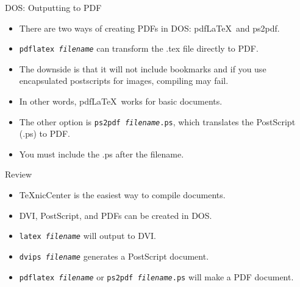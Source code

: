 \documentclass[pdf]{prosper}
\begin{document}
\begin{slide}{DOS: Outputting to PDF}
	\begin{itemize}
		\item There are two ways of creating PDFs in DOS: pdf\LaTeX\ and ps2pdf.
		\item \texttt{pdflatex \textit{filename}} can transform the .tex file directly to PDF.
		\item The downside is that it will not include bookmarks and if you use encapsulated postscripts for images, compiling may fail.
		\item In other words, pdf\LaTeX\ works for basic documents.
		\item The other option is \texttt{ps2pdf \textit{filename}.ps}, which translates the PostScript (.ps) to PDF.
		\item You must include the .ps after the filename.
	\end{itemize}
\end{slide}
\begin{slide}{Review}
	\begin{itemize}
		\item \TeX nicCenter is the easiest way to compile documents.
		\item DVI, PostScript, and PDFs can be created in DOS.
		\item \texttt{latex \textit{filename}} will output to DVI.
		\item \texttt{dvips \textit{filename}} generates a PostScript document.
		\item \texttt{pdflatex \textit{filename}} or \texttt{ps2pdf \textit{filename}.ps} will make a PDF document.
	\end{itemize}
\end{slide}
\end{document}
